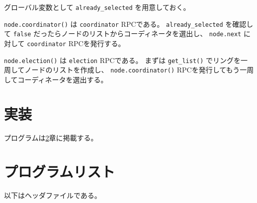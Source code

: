 \documentclass[a4paper]{jlreq}
\begin{document}
グローバル変数として \texttt{already\_selected} を用意しておく。

\texttt{node.coordinator()} は \texttt{coordinator} RPCである。
\texttt{already\_selected} を確認して \texttt{false} だったらノードのリストからコーディネータを選出し、
\texttt{node.next} に対して \texttt{coordinator} RPCを発行する。

\texttt{node.election()} は \texttt{election} RPCである。
まずは \texttt{get\_list()} でリングを一周してノードのリストを作成し、
\texttt{node.coordinator()} RPCを発行してもう一周してコーディネータを選出する。

\section{実装}

プログラムは\ref{sec:proglist}章に掲載する。



\section{プログラムリスト}
\label{sec:proglist}





以下はヘッダファイルである。




\end{document}
